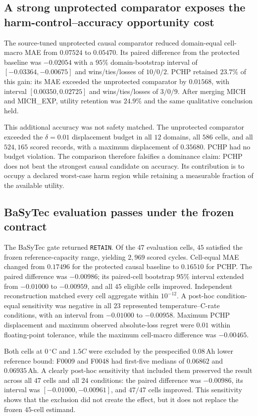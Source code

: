 \documentclass[11pt]{article}
\begin{document}
\subsection{A strong unprotected comparator exposes the harm-control--accuracy opportunity cost}

The source-tuned unprotected causal comparator reduced domain-equal cell-macro MAE from $0.07524$ to $0.05470$. Its paired difference from the protected baseline was $-0.02054$ with a $95\%$ domain-bootstrap interval of $[-0.03364,-0.00675]$ and wins/ties/losses of $10/0/2$. PCHP retained $23.7\%$ of this gain: its MAE exceeded the unprotected comparator by $0.01568$, with interval $[0.00350,0.02725]$ and wins/ties/losses of $3/0/9$. After merging MICH and MICH\_EXP, utility retention was $24.9\%$ and the same qualitative conclusion held.

This additional accuracy was not safety matched. The unprotected comparator exceeded the $\delta=0.01$ displacement budget in all $12$ domains, all $586$ cells, and all $524{,}165$ scored records, with a maximum displacement of $0.35680$. PCHP had no budget violation. The comparison therefore falsifies a dominance claim: PCHP does not beat the strongest causal candidate on accuracy. Its contribution is to occupy a declared worst-case harm region while retaining a measurable fraction of the available utility.

\subsection{BaSyTec evaluation passes under the frozen contract}

The BaSyTec gate returned \texttt{RETAIN}. Of the $47$ evaluation cells, $45$ satisfied the frozen reference-capacity range, yielding $2{,}969$ scored cycles. Cell-equal MAE changed from $0.17496$ for the protected causal baseline to $0.16510$ for PCHP. The paired difference was $-0.00986$; its paired-cell bootstrap $95\%$ interval extended from $-0.01000$ to $-0.00959$, and all $45$ eligible cells improved. Independent reconstruction matched every cell aggregate within $10^{-12}$. A post-hoc condition-equal sensitivity was negative in all $23$ represented temperature--C-rate conditions, with an interval from $-0.01000$ to $-0.00958$. Maximum PCHP displacement and maximum observed absolute-loss regret were $0.01$ within floating-point tolerance, while the maximum cell-macro difference was $-0.00465$.

Both cells at $0\,^{\circ}\mathrm{C}$ and $1.5C$ were excluded by the prespecified $0.08\,\mathrm{Ah}$ lower reference bound: F0009 and F0048 had first-five medians of $0.06862$ and $0.06935\,\mathrm{Ah}$. A clearly post-hoc sensitivity that included them preserved the result across all $47$ cells and all $24$ conditions: the paired difference was $-0.00986$, its interval was $[-0.01000,-0.00961]$, and $47/47$ cells improved. This sensitivity shows that the exclusion did not create the effect, but it does not replace the frozen $45$-cell estimand.
\end{document}
